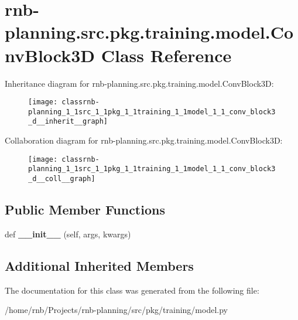 \hypertarget{classrnb-planning_1_1src_1_1pkg_1_1training_1_1model_1_1_conv_block3_d}{}\section{rnb-\/planning.src.\+pkg.\+training.\+model.\+Conv\+Block3D Class Reference}
\label{classrnb-planning_1_1src_1_1pkg_1_1training_1_1model_1_1_conv_block3_d}


Inheritance diagram for rnb-\/planning.src.\+pkg.\+training.\+model.\+Conv\+Block3D\+:\nopagebreak
\begin{figure}[H]
\begin{center}
\leavevmode
\texttt{[image: classrnb-planning\_1\_1src\_1\_1pkg\_1\_1training\_1\_1model\_1\_1\_conv\_block3\_d\_\_inherit\_\_graph]}
\end{center}
\end{figure}


Collaboration diagram for rnb-\/planning.src.\+pkg.\+training.\+model.\+Conv\+Block3D\+:\nopagebreak
\begin{figure}[H]
\begin{center}
\leavevmode
\texttt{[image: classrnb-planning\_1\_1src\_1\_1pkg\_1\_1training\_1\_1model\_1\_1\_conv\_block3\_d\_\_coll\_\_graph]}
\end{center}
\end{figure}
\subsection*{Public Member Functions}
\begin{DoxyCompactItemize}
\item 
\mbox{\label{classrnb-planning_1_1src_1_1pkg_1_1training_1_1model_1_1_conv_block3_d_aaf5bc71054db30a52e4771ded9edf1be}} 
def {\bfseries \+\_\+\+\_\+init\+\_\+\+\_\+} (self, args, kwargs)
\end{DoxyCompactItemize}
\subsection*{Additional Inherited Members}


The documentation for this class was generated from the following file\+:\begin{DoxyCompactItemize}
\item 
/home/rnb/\+Projects/rnb-\/planning/src/pkg/training/model.\+py\end{DoxyCompactItemize}
